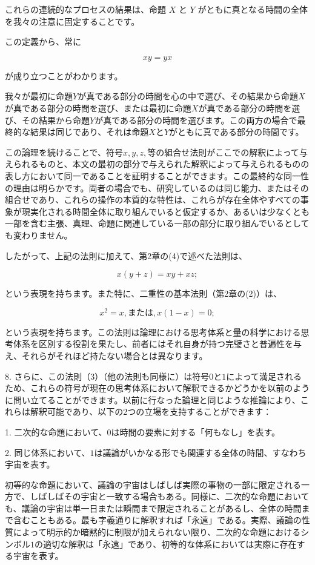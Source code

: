 \documentclass[a4paper,11pt,openany]{ltjsbook}
\begin{document}
これらの連続的なプロセスの結果は、命題 $X$ と $Y$ がともに真となる時間の全体を我々の注意に固定することです。

この定義から、常に

\[
xy = yx
\]

が成り立つことがわかります。

我々が最初に命題$Y$が真である部分の時間を心の中で選び、その結果から命題$X$が真である部分の時間を選び、または最初に命題$X$が真である部分の時間を選び、その結果から命題$Y$が真である部分の時間を選びます。この両方の場合で最終的な結果は同じであり、それは命題$X$と$Y$がともに真である部分の時間です。

この論理を続けることで、符号$x, y, z, 等$の組合せ法則がここでの解釈によって与えられるものと、本文の最初の部分で与えられた解釈によって与えられるものの表し方において同一であることを証明することができます。この最終的な同一性の理由は明らかです。両者の場合でも、研究しているのは同じ能力、またはその組合せであり、これらの操作の本質的な特性は、これらが存在全体やすべての事象が現実化される時間全体に取り組んでいると仮定するか、あるいは少なくとも一部を含む主張、真理、命題に関連している一部の部分に取り組んでいるとしても変わりません。

したがって、上記の法則に加えて、第2章の(4)で述べた法則は、

\begin{equation}
x(y + z) = xy + xz;
\end{equation}

という表現を持ちます。また特に、二重性の基本法則（第2章の(2)）は、

\begin{equation}
x^2 = x, または, x (1 - x) = 0;
\end{equation}

という表現を持ちます。この法則は論理における思考体系と量の科学における思考体系を区別する役割を果たし、前者にはそれ自身が持つ完璧さと普遍性を与え、それらがそれほど持たない場合とは異なります。

8. さらに、この法則（3）（他の法則も同様に）は符号$0$と$1$によって満足されるため、これらの符号が現在の思考体系において解釈できるかどうかを以前のように問い立てることができます。以前に行なった論理と同じような推論により、これらは解釈可能であり、以下の2つの立場を支持することができます：

1. 二次的な命題において、$0$は時間の要素に対する「何もなし」を表す。

2. 同じ体系において、$1$は議論がいかなる形でも関連する全体の時間、すなわち宇宙を表す。

初等的な命題において、議論の宇宙はしばしば実際の事物の一部に限定される一方で、しばしばその宇宙と一致する場合もある。同様に、二次的な命題においても、議論の宇宙は単一日または瞬間まで限定されることがあるし、全体の時間まで含むこともある。最も字義通りに解釈すれば「永遠」である。実際、議論の性質によって明示的か暗黙的に制限が加えられない限り、二次的な命題におけるシンボル$1$の適切な解釈は「永遠」であり、初等的な体系においては実際に存在する宇宙を表す。
\end{document}
